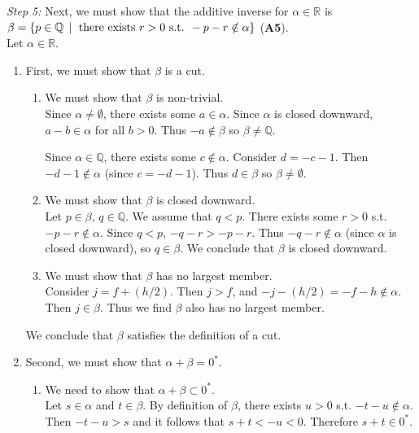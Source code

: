 \documentclass[../main.tex]{subfiles}
\begin{document}
\emph{Step 5:} Next, we must show that the additive inverse for \( \alpha \in \mathbb{R} \) is
\( \beta = \{ p \in \mathbb{Q} \, \mid \text{ there exists } \\ r > 0 \text{ s.t. } -p-r \notin \alpha \} \) (\textbf{A5}). \\
Let \( \alpha \in \mathbb{R} \).
\begin{enumerate}
    \item First, we must show that \( \beta \) is a cut.
    \begin{enumerate}[label=\roman*.]
        \item We must show that \( \beta \) is non-trivial. \\
        Since \( \alpha \neq \emptyset \), there exists some \( a \in \alpha \).
        Since \( \alpha \) is closed downward, \( a-b \in \alpha \) for all \( b > 0 \).
        Thus \( -a \notin \beta \) so \( \beta \neq \mathbb{Q} \).

        Since \( \alpha \in \mathbb{Q}\), there exists some \( c \notin \alpha \).
        Consider \( d = -c-1 \). Then \( -d-1 \notin \alpha \) (since \( c = -d -1 \)).
        Thus \( d \in \beta \) so \( \beta \neq \emptyset \).

        \item We must show that \( \beta \) is closed downward. \\
        Let \( p \in \beta, \, q \in \mathbb{Q} \). We assume that \( q < p \).
        There exists some \( r > 0 \) s.t. \( -p-r \notin \alpha \).
        Since \( q < p \), \( -q-r > -p-r \). Thus \( -q-r \notin \alpha \) (since \( \alpha \) is closed downward), so \( q \in \beta \).
        We conclude that \( \beta \) is closed downward.

        \item We must show that \( \beta \) has no largest member. \\
        Consider \( j = f + (h/2) \). Then \( j > f \), and \( -j - (h/2) = -f - h \notin \alpha \). Then \( j \in \beta \).
        Thus we find \( \beta \) also has no largest member.
    \end{enumerate}
    We conclude that \( \beta \) satisfies the definition of a cut.

    \item Second, we must show that \( \alpha + \beta = 0^* \).
    \begin{enumerate}[label=\roman*.]
        \item We need to show that \( \alpha + \beta \subset 0^* \). \\
        Let \( s \in \alpha \) and \( t \in \beta \). By definition of \( \beta \), there exists \( u > 0 \) s.t. \( -t-u \notin \alpha \).
        Then \( -t-u > s \) and it follows that \( s + t < -u < 0 \). Therefore \( s+t \in 0^* \).


\end{enumerate}
\end{enumerate}
\end{document}

